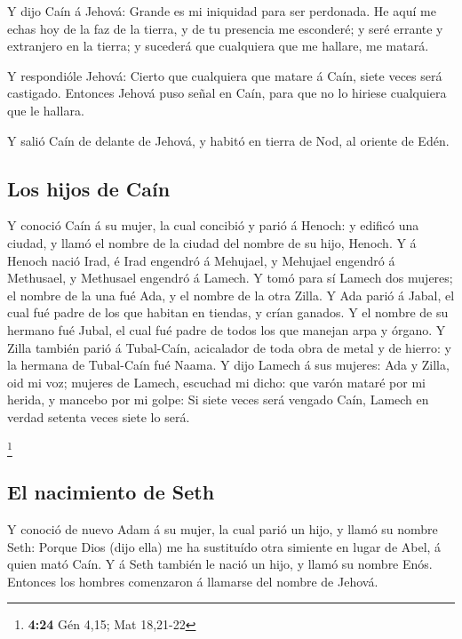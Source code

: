  Y dijo Caín á Jehová: Grande es mi iniquidad para ser
perdonada.  He aquí me echas hoy de la faz de la tierra,
y de tu presencia me esconderé; y seré errante y extranjero en la
tierra; y sucederá que cualquiera que me hallare, me matará.

 Y respondióle Jehová: Cierto que cualquiera que matare á
Caín, siete veces será castigado. Entonces Jehová puso señal en Caín,
para que no lo hiriese cualquiera que le hallara.

 Y salió Caín de delante de Jehová, y habitó en tierra de
Nod, al oriente de Edén.

\hypertarget{los-hijos-de-cauxedn}{%
\subsection{Los hijos de Caín}\label{los-hijos-de-cauxedn}}

 Y conoció Caín á su mujer, la cual concibió y parió á
Henoch: y edificó una ciudad, y llamó el nombre de la ciudad del nombre
de su hijo, Henoch.  Y á Henoch nació Irad, é Irad
engendró á Mehujael, y Mehujael engendró á Methusael, y Methusael
engendró á Lamech.  Y tomó para sí Lamech dos mujeres; el
nombre de la una fué Ada, y el nombre de la otra Zilla. 
Y Ada parió á Jabal, el cual fué padre de los que habitan en tiendas, y
crían ganados.  Y el nombre de su hermano fué Jubal, el
cual fué padre de todos los que manejan arpa y órgano.  Y
Zilla también parió á Tubal-Caín, acicalador de toda obra de metal y de
hierro: y la hermana de Tubal-Caín fué Naama.  Y dijo
Lamech á sus mujeres: Ada y Zilla, oid mi voz; mujeres de Lamech,
escuchad mi dicho: que varón mataré por mi herida, y mancebo por mi
golpe:  Si siete veces será vengado Caín, Lamech en
verdad setenta veces siete lo será.

\footnote{\textbf{4:24} Gén 4,15; Mat 18,21-22}

\hypertarget{el-nacimiento-de-seth}{%
\subsection{El nacimiento de Seth}\label{el-nacimiento-de-seth}}

 Y conoció de nuevo Adam á su mujer, la cual parió un
hijo, y llamó su nombre Seth: Porque Dios (dijo ella) me ha sustituído
otra simiente en lugar de Abel, á quien mató Caín.  Y á
Seth también le nació un hijo, y llamó su nombre Enós. Entonces los
hombres comenzaron á llamarse del nombre de Jehová.

